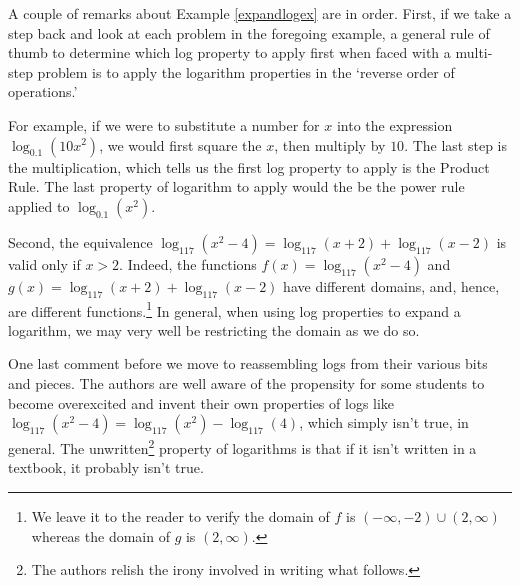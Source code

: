 \documentclass{ximera}
\begin{document}
A couple of remarks about Example \ref{expandlogex} are in order.  First, if we take a step back and look at each problem in the foregoing example, a general rule of thumb to determine which log property to apply first when faced with a multi-step problem is to apply the logarithm properties in the  `reverse order of operations.'


For example, if we were to substitute a number for $x$ into the expression $\log_{0.1} \left(10 x^2 \right)$, we would first square the $x$, then multiply by $10$.  The last step is the multiplication, which tells us the first log property to apply is the Product Rule.  The last property of logarithm to apply would the be the power rule applied to $\log_{0.1}(x^2)$.

Second,  the equivalence $\log_{117}\left(x^2-4\right) = \log_{117}(x+2) + \log_{117}(x-2)$ is valid only if $x > 2$.  Indeed,  the functions $f(x) = \log_{117}\left(x^2-4\right)$ and $g(x) = \log_{117}(x+2) + \log_{117}(x-2)$ have different domains, and, hence, are different functions.\footnote{We leave it to the reader to verify the domain of $f$ is $(-\infty, -2) \cup (2,\infty)$ whereas the domain of $g$ is $(2,\infty)$.} In general, when using log properties to expand a logarithm, we may very well be restricting the domain as we do so. 

One last comment before we move to reassembling logs from their various bits and pieces. The authors are well aware of the propensity for some students to become overexcited and invent their own properties of logs like $\log_{117}\left(x^2-4\right) = \log_{117}\left(x^2\right) - \log_{117}(4)$, which simply isn't true, in general.  The unwritten\footnote{The authors relish the irony involved in writing what follows.} property of logarithms is that if it isn't written in a textbook, it probably isn't true.    
\end{document}
